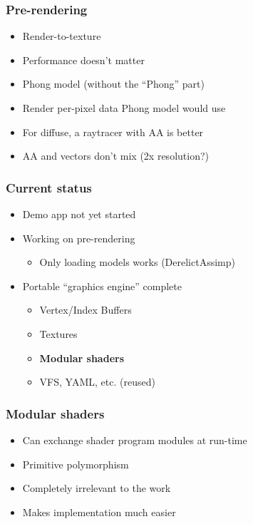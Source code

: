 \documentclass{beamer}
\begin{document}
\begin{frame}\frametitle{Pre-rendering}

\begin{itemize}
\item
  Render-to-texture
\item
  Performance doesn't matter
\item
  Phong model (without the ``Phong'' part)
\item
  Render per-pixel data Phong model would use
\item
  For diffuse, a raytracer with AA is better
\item
  AA and vectors don't mix (2x resolution?)
\end{itemize}

\end{frame}

\begin{frame}\frametitle{Current status}

\begin{itemize}
\item
  Demo app not yet started
\item
  Working on pre-rendering

  \begin{itemize}
  \item
    Only loading models works (DerelictAssimp)
  \end{itemize}
\item
  Portable ``graphics engine'' complete

  \begin{itemize}
  \item
    Vertex/Index Buffers
  \item
    Textures
  \item
    \textbf{Modular shaders}
  \item
    VFS, YAML, etc. (reused)
  \end{itemize}
\end{itemize}

\end{frame}

\begin{frame}\frametitle{Modular shaders}

\begin{itemize}
\item
  Can exchange shader program modules at run-time
\item
  Primitive polymorphism
\item
  Completely irrelevant to the work
\item
  Makes implementation much easier
\end{itemize}

\end{frame}
\end{document}
